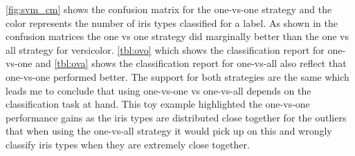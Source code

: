 \documentclass[11pt]{article}
\begin{document}
 \autoref{fig:svm_cm}  shows the confusion matrix for the one-vs-one strategy and the color represents the number of iris types classified for a label. As shown in the confusion matrices the one vs one strategy did marginally better than the one vs all strategy for versicolor. \autoref{tbl:ovo} which shows the classification report for one-vs-one and \autoref{tbl:ova} shows the classification report for one-vs-all also reflect that one-vs-one performed better. The support for both strategies are the same which leads me to conclude that using one-vs-one vs one-vs-all depends on the classification task at hand. This toy example highlighted the one-vs-one performance gains as the iris types are distributed close together for the outliers that when using the one-vs-all  strategy it would  pick up on this and wrongly classify iris types when they are extremely close together.
\end{document}
